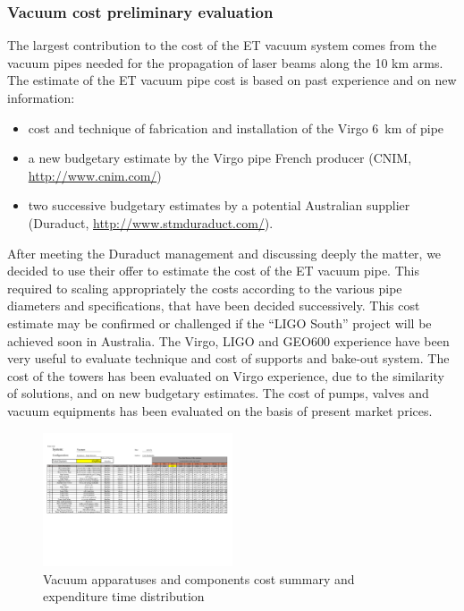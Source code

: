 \subsubsection[Vacuum costs]{Vacuum cost preliminary evaluation}
%  
\label{ConclusionsVacuumCostsSubSection}
%
The largest contribution to the cost of the ET vacuum system comes from the vacuum pipes needed for the propagation of laser beams along the 10 km arms.
The estimate of the ET vacuum pipe cost is based on past experience and on new information:
%
\begin{itemize}
\item cost and technique of fabrication and installation of the Virgo 6~km of pipe
\item a new budgetary estimate by the Virgo pipe French producer (CNIM, \url{http://www.cnim.com/})
\item two successive budgetary estimates by a potential Australian supplier (Duraduct, \url{http://www.stmduraduct.com/}).
\end{itemize}
%
After meeting the Duraduct management and discussing deeply the matter, we decided to use their offer to estimate the cost of the ET vacuum pipe. This required to scaling appropriately the costs according to the various pipe diameters and specifications, that have been decided successively. This cost estimate may be confirmed or challenged if the ``LIGO South'' project will be achieved soon in Australia. The Virgo, LIGO and GEO600 experience have been very useful to evaluate technique and cost of supports and bake-out system.
The cost of the towers has been evaluated on Virgo experience, due to the similarity of solutions, and on new budgetary estimates.
The cost of pumps, valves and vacuum equipments has been evaluated on the basis of present market prices.
%
%
\FloatBarrier
\begin{figure}[h]
\centering 
\includegraphics[angle=90, width=0.5\textwidth]{Sec_Conclusions/ET-cost-v00r05-Vacuum.pdf}
\caption{Vacuum apparatuses and components cost summary and expenditure time distribution}
\label{Fig:VacuumCostTable}
\end{figure}
%
